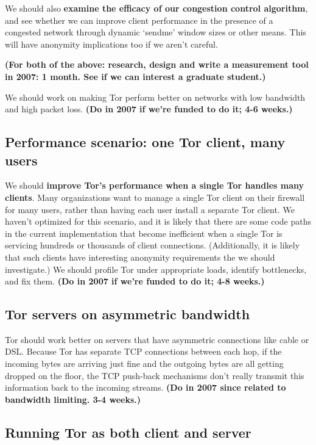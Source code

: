 \documentclass{article}
\newcommand{\plan}[1]{ {\bf (#1)}}
\begin{document}
We should also {\bf examine the efficacy of our congestion control
  algorithm}, and see whether we can improve client performance in the
presence of a congested network through dynamic `sendme' window sizes or
other means.  This will have anonymity implications too if we aren't careful.

\plan{For both of the above: research, design and write
  a measurement tool in 2007: 1 month.  See if we can interest a graduate
  student.}

We should work on making Tor perform better on networks with low bandwidth
and high packet loss.\plan{Do in 2007 if we're funded to do it; 4-6 weeks.}

\subsection{Performance scenario: one Tor client, many users}
We should {\bf improve Tor's performance when a single Tor handles many
  clients}.  Many organizations want to manage a single Tor client on their
firewall for many users, rather than having each user install a separate
Tor client.  We haven't optimized for this scenario, and it is likely that
there are some code paths in the current implementation that become
inefficient when a single Tor is servicing hundreds or thousands of client
connections.  (Additionally, it is likely that such clients have interesting
anonymity requirements the we should investigate.)  We should profile Tor
under appropriate loads, identify bottlenecks, and fix them.\plan{Do in 2007
  if we're funded to do it; 4-8 weeks.}

\subsection{Tor servers on asymmetric bandwidth}

Tor should work better on servers that have asymmetric connections like cable
or DSL.  Because Tor has separate TCP connections between each
hop, if the incoming bytes are arriving just fine and the outgoing bytes are
all getting dropped on the floor, the TCP push-back mechanisms don't really
transmit this information back to the incoming streams.\plan{Do in 2007 since
  related to bandwidth limiting.  3-4 weeks.}

\subsection{Running Tor as both client and server}
\end{document}
